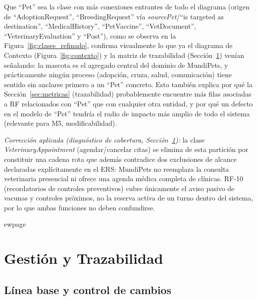 \documentclass[journal,onecolumn]{IEEEtran}
\begin{document}
	Que ``Pet'' sea la clase con más conexiones entrantes de todo el
	diagrama (origen de ``AdoptionRequest'', ``BreedingRequest'' vía
	\textit{sourcePet}/``is targeted as destination'', ``MedicalHistory'',
	``PetVaccine'', ``VetDocument'',
	``VeterinaryEvaluation'' y ``Post''), como se observa en la
	Figura~\ref{fig:clases_refinado}, confirma visualmente lo que ya el
	diagrama de Contexto (Figura~\ref{fig:contexto}) y la matriz de
	trazabilidad (Sección~\ref{sec:trazabilidad}) venían señalando: la
	mascota es el agregado central del dominio de MundiPets, y prácticamente
	ningún proceso (adopción, cruza, salud, comunicación) tiene sentido sin
	anclarse primero a un ``Pet'' concreto. Esto también explica por qué la
	Sección~\ref{sec:metricas} (trazabilidad) probablemente encuentre más
	filas asociadas a RF relacionados con ``Pet'' que con cualquier otra
	entidad, y por qué un defecto en el modelo de ``Pet'' tendría el radio
	de impacto más amplio de todo el sistema (relevante para M5,
	modificabilidad).
	
	\noindent\textit{Corrección aplicada (diagnóstico de cobertura,
	Sección~\ref{sec:trazabilidad}):} la clase \textit{VeterinaryAppointment}
	(agendar/cancelar citas) se elimina de esta partición por constituir una
	cadena rota que además contradice dos exclusiones de alcance declaradas
	explícitamente en el ERS: MundiPets no reemplaza la consulta veterinaria
	presencial ni ofrece una agenda médica completa de clínicas. RF-10
	(recordatorios de controles preventivos) cubre únicamente el aviso
	pasivo de vacunas y controles próximos, no la reserva activa de un turno
	dentro del sistema, por lo que ambas funciones no deben confundirse.
	
	\newpage
	
	

ewpage

\section{Gestión y Trazabilidad}
\label{sec:trazabilidad}

\subsection{Línea base y control de cambios}
\end{document}
